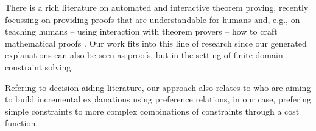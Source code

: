 
There is a rich literature on automated and interactive theorem proving, recently focussing on providing proofs that are understandable for humans \cite{Ganesalingam2017} and, e.g.,  on teaching humans -- using interaction with theorem provers -- how to craft mathematical proofs  \cite{DBLP:conf/icml/YangD19}. 
Our work fits into this line of research since our generated explanations can also be seen as proofs, but in the setting of finite-domain constraint solving.

Refering to decision-aiding literature, our approach also relates to \cite{belahcene2017explaining} who are aiming to build incremental explanations using preference relations, in our case, prefering simple constraints to more complex combinations of constraints through a cost function.



